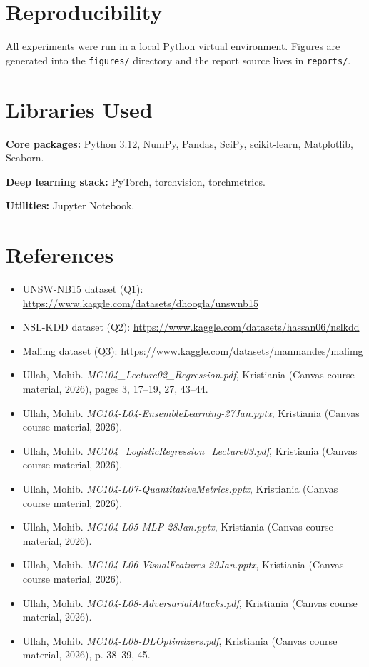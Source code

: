 \documentclass[11pt]{article}
\begin{document}
\section{Reproducibility}
All experiments were run in a local Python virtual environment. Figures are generated into the \texttt{figures/} directory and the report source lives in \texttt{reports/}.

\section{Libraries Used}
\textbf{Core packages:} Python 3.12, NumPy, Pandas, SciPy, scikit-learn, Matplotlib, Seaborn.

\textbf{Deep learning stack:} PyTorch, torchvision, torchmetrics.

\textbf{Utilities:} Jupyter Notebook.

\section{References}
\begin{itemize}
  \item UNSW-NB15 dataset (Q1): \url{https://www.kaggle.com/datasets/dhoogla/unswnb15}
  \item NSL-KDD dataset (Q2): \url{https://www.kaggle.com/datasets/hassan06/nslkdd}
  \item Malimg dataset (Q3): \url{https://www.kaggle.com/datasets/manmandes/malimg}
  \item Ullah, Mohib. \textit{MC104\_Lecture02\_Regression.pdf}, Kristiania (Canvas course material, 2026), pages 3, 17--19, 27, 43--44.
  \item Ullah, Mohib. \textit{MC104-L04-EnsembleLearning-27Jan.pptx}, Kristiania (Canvas course material, 2026).
  \item Ullah, Mohib. \textit{MC104\_LogisticRegression\_Lecture03.pdf}, Kristiania (Canvas course material, 2026).
  \item Ullah, Mohib. \textit{MC104-L07-QuantitativeMetrics.pptx}, Kristiania (Canvas course material, 2026).
  \item Ullah, Mohib. \textit{MC104-L05-MLP-28Jan.pptx}, Kristiania (Canvas course material, 2026).
  \item Ullah, Mohib. \textit{MC104-L06-VisualFeatures-29Jan.pptx}, Kristiania (Canvas course material, 2026).
  \item Ullah, Mohib. \textit{MC104-L08-AdversarialAttacks.pdf}, Kristiania (Canvas course material, 2026).
  \item Ullah, Mohib. \textit{MC104-L08-DLOptimizers.pdf}, Kristiania (Canvas course material, 2026), p. 38--39, 45.
\end{itemize}
\end{document}
